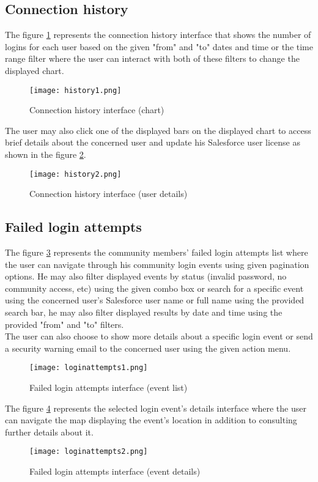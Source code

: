 \subsection{Connection history}
The figure \ref{history1} represents the connection history interface that shows the number of logins for each user based on the given "from" and "to" dates and time or the time range filter where the user can interact with both of these filters to change the displayed chart.  
\begin{figure}[H]%
    \center   
    
    \texttt{[image: history1.png]}
    \caption{Connection history interface (chart)}
    \label{history1}
\end{figure}
The user may also click one of the displayed bars on the displayed chart to access brief details about the concerned user and update his Salesforce user license as shown in the figure \ref{history2}.
\begin{figure}[H]%
    \center   
    
    \texttt{[image: history2.png]}
    \caption{Connection history interface (user details)}
    \label{history2}
\end{figure}
\subsection{Failed login attempts}
The figure \ref{loginattempts1} represents the community members' failed login attempts list where the user can navigate through his community login events using given pagination options. He may also filter displayed events by status (invalid password, no community access, etc) using the given combo box or search for a specific event using the concerned user's Salesforce user name or full name using the provided search bar, he may also filter displayed results by date and time using the provided "from" and "to" filters.\\
The user can also choose to show more details about a specific login event or send a security warning email to the concerned user using the given action menu.

\begin{figure}[H]%
    \center   
    
    \texttt{[image: loginattempts1.png]}
    \caption{Failed login attempts interface (event list)}
    \label{loginattempts1}
\end{figure}
The figure \ref{loginattempts2} represents the selected login event's details interface where the user can navigate the map displaying the event's location in addition to consulting further details about it.
 \begin{figure}[H]%
    \center   
    
    \texttt{[image: loginattempts2.png]}
    \caption{Failed login attempts interface (event details)}
    \label{loginattempts2}
\end{figure}
